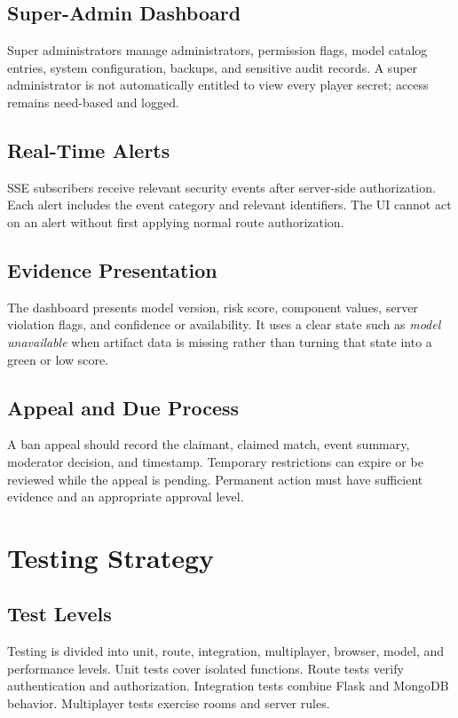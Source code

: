 \documentclass[12pt,a4paper,oneside]{report}
\begin{document}
\section{Super-Admin Dashboard}
Super administrators manage administrators, permission flags, model catalog entries, system configuration, backups, and sensitive audit records. A super administrator is not automatically entitled to view every player secret; access remains need-based and logged.

\section{Real-Time Alerts}
SSE subscribers receive relevant security events after server-side authorization. Each alert includes the event category and relevant identifiers. The UI cannot act on an alert without first applying normal route authorization.

\section{Evidence Presentation}
The dashboard presents model version, risk score, component values, server violation flags, and confidence or availability. It uses a clear state such as \textit{model unavailable} when artifact data is missing rather than turning that state into a green or low score.

\section{Appeal and Due Process}
A ban appeal should record the claimant, claimed match, event summary, moderator decision, and timestamp. Temporary restrictions can expire or be reviewed while the appeal is pending. Permanent action must have sufficient evidence and an appropriate approval level.

\chapter{Testing Strategy}
\section{Test Levels}
Testing is divided into unit, route, integration, multiplayer, browser, model, and performance levels. Unit tests cover isolated functions. Route tests verify authentication and authorization. Integration tests combine Flask and MongoDB behavior. Multiplayer tests exercise rooms and server rules.
\end{document}
